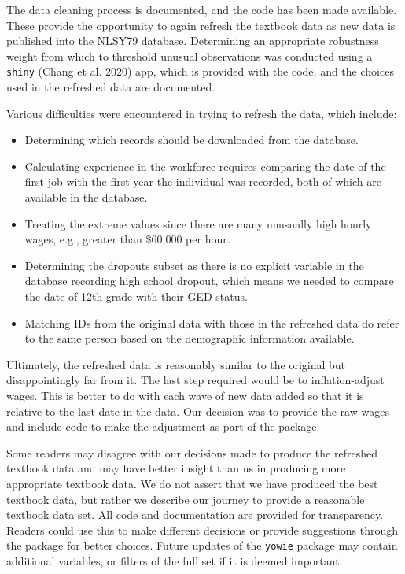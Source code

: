 \documentclass{article}
\providecommand{\tightlist}{%
  \setlength{\itemsep}{0pt}\setlength{\parskip}{0pt}}
\begin{document}
The data cleaning process is documented, and the code has been made available. These provide the opportunity to again refresh the textbook data as new data is published into the NLSY79 database. Determining an appropriate robustness weight from which to threshold unusual observations was conducted using a \texttt{shiny} (Chang et al. 2020) app, which is provided with the code, and the choices used in the refreshed data are documented.

Various difficulties were encountered in trying to refresh the data, which include:

\begin{itemize}
\tightlist
\item
  Determining which records should be downloaded from the database.
\item
  Calculating experience in the workforce requires comparing the date of the first job with the first year the individual was recorded, both of which are available in the database.
\item
  Treating the extreme values since there are many unusually high hourly wages, e.g., greater than \$60,000 per hour.
\item
  Determining the dropouts subset as there is no explicit variable in the database recording high school dropout, which means we needed to compare the date of 12th grade with their GED status.
\item
  Matching IDs from the original data with those in the refreshed data do refer to the same person based on the demographic information available.
\end{itemize}

Ultimately, the refreshed data is reasonably similar to the original but disappointingly far from it. The last step required would be to inflation-adjust wages. This is better to do with each wave of new data added so that it is relative to the last date in the data. Our decision was to provide the raw wages and include code to make the adjustment as part of the package.

Some readers may disagree with our decisions made to produce the refreshed textbook data and may have better insight than us in producing more appropriate textbook data. We do not assert that we have produced the best textbook data, but rather we describe our journey to provide a reasonable textbook data set. All code and documentation are provided for transparency. Readers could use this to make different decisions or provide suggestions through the package for better choices. Future updates of the \texttt{yowie} package may contain additional variables, or filters of the full set if it is deemed important.
\end{document}
